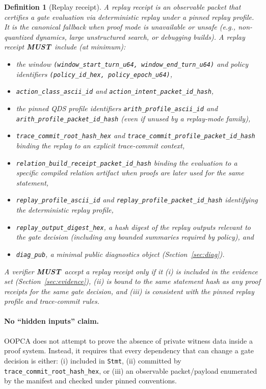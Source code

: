 \documentclass[11pt]{article}
\newcommand{\MUST}{\textbf{MUST}}
\newtheorem{definition}{Definition}
\begin{document}
\begin{definition}[Replay receipt]
A \emph{replay receipt} is an observable packet that certifies a gate evaluation via deterministic replay under a pinned replay profile.
It is the canonical fallback when proof mode is unavailable or unsafe (e.g., non-quantized dynamics, large unstructured search, or debugging builds).
A replay receipt \MUST\ include (at minimum):
\begin{itemize}[leftmargin=1.2em]
\item the window \texttt{(window\_start\_turn\_u64, window\_end\_turn\_u64)} and policy identifiers \texttt{(policy\_id\_hex, policy\_epoch\_u64)},
\item \texttt{action\_class\_ascii\_id} and \texttt{action\_intent\_packet\_id\_hash},
\item the pinned QDS profile identifiers \texttt{arith\_profile\_ascii\_id} and \texttt{arith\_profile\_packet\_id\_hash} (even if unused by a replay-mode family),
\item \texttt{trace\_commit\_root\_hash\_hex} and \texttt{trace\_commit\_profile\_packet\_id\_hash} binding the replay to an explicit trace-commit context,
\item \texttt{relation\_build\_receipt\_packet\_id\_hash} binding the evaluation to a specific compiled relation artifact when proofs are later used for the same statement,
\item \texttt{replay\_profile\_ascii\_id} and \texttt{replay\_profile\_packet\_id\_hash} identifying the deterministic replay profile,
\item \texttt{replay\_output\_digest\_hex}, a hash digest of the replay outputs relevant to the gate decision (including any bounded summaries required by policy), and
\item \texttt{diag\_pub}, a minimal public diagnostics object (Section~\ref{sec:diag}).
\end{itemize}
A verifier \MUST\ accept a replay receipt only if it (i) is included in the evidence set (Section~\ref{sec:evidence}), (ii) is bound to the same statement hash as any proof receipts for the same gate decision, and (iii) is consistent with the pinned replay profile and trace-commit rules.
\end{definition}

\paragraph{No ``hidden inputs'' claim.}
OOPCA does not attempt to prove the absence of private witness data inside a proof system. Instead, it requires that every dependency that can change a gate decision is either:
(i) included in \texttt{Stmt},
(ii) committed by \texttt{trace\_commit\_root\_hash\_hex}, or
(iii) an observable packet/payload enumerated by the manifest and checked under pinned conventions.
\end{document}
